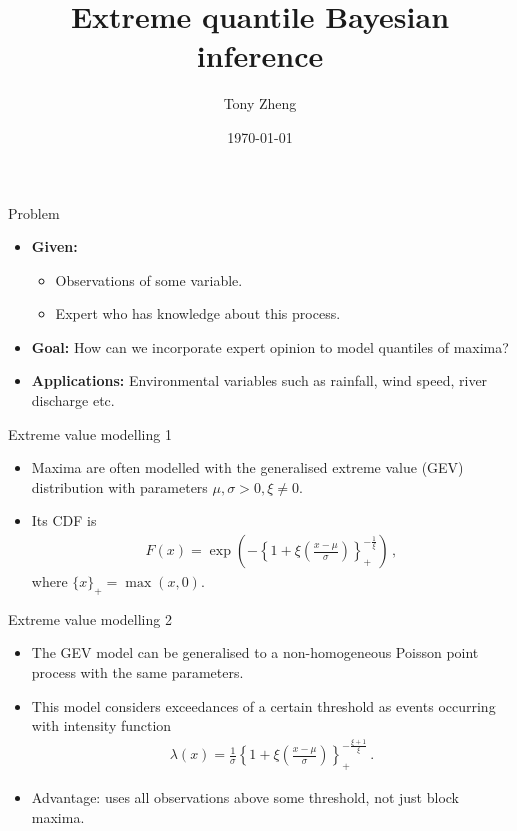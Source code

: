 \documentclass[10pt]{beamer}
\title[%
	Extreme quantile Bayesian estimators]
{%
	\textbf{Extreme quantile Bayesian inference}}
\subtitle[]{}
\author[Tony Zheng]{Tony Zheng}
\institute[]{}
\date{\today}
\begin{document}
%
{\1\begin{frame}\titlepage\end{frame}}
%
%
\begin{frame}{Problem}{}
%
\begin{itemize}
	\item[] \textbf{Given:}
		\begin{itemize}
			\item Observations of some variable.
			\item Expert who has knowledge about this process.
		\end{itemize}
	\item[] \textbf{Goal:} How can we incorporate expert opinion
		to model quantiles of maxima?
	\item[] \textbf{Applications:} Environmental variables such as
	rainfall, wind speed, river discharge etc.
\end{itemize}
%
\end{frame}
%
%
\begin{frame}{Extreme value modelling 1}{}
%
\begin{itemize}
	\item Maxima are often modelled with the
		generalised extreme value (GEV)
		distribution with parameters $\mu, \sigma > 0, \xi \neq 0$.
	\item Its CDF is
		\begin{align*}
			F(x) =
				\exp\left(-\left\{1 + \xi
				\left(\frac{x - \mu}{\sigma}\right)\right\}_+
				^ {-\frac{1}{\xi}}\right) \,,
		\end{align*}
		where $\{x\}_+ = \max(x, 0)$.
\end{itemize}
%
\end{frame}
%
%
\begin{frame}{Extreme value modelling 2}{}
%
\begin{itemize}
	\item The GEV model can be generalised to a
		non-homogeneous Poisson point process
		with the same parameters.
	\item This model considers exceedances of a certain threshold as events
		occurring with intensity function
		\begin{align*}
			\lambda(x) =
			\frac{1}{\sigma}
				\left\{1 + \xi \left(\frac{x - \mu}{\sigma}\right)\right\}_+
				^ {-\frac{\xi + 1}{\xi}} \,.
		\end{align*}
	\item Advantage: uses all observations above some threshold,
		not just block maxima.
\end{itemize}
%
\end{frame}
\end{document}

